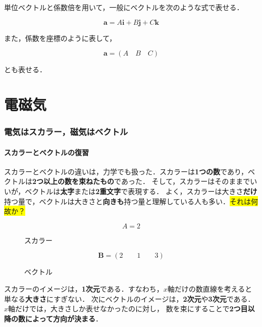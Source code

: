 \documentclass[a4paper,11pt]{ltjsarticle}
\begin{document}
単位ベクトルと係数倍を用いて，一般にベクトルを次のような式で表せる．

\begin{equation}
  \bm{a}=A \bm{i}+B \bm{j}+C \bm{k}
\end{equation}

また，係数を座標のように表して，

\begin{equation}
  \bm{a}=(A \quad B \quad C)
\end{equation}

とも表せる．

\clearpage

\part{電磁気}

\section{電気はスカラー，磁気はベクトル}

\subsection{スカラーとベクトルの復習}

スカラーとベクトルの違いは，力学でも扱った．スカラーは\textbf{1つの数}であり，ベクトルは\textbf{2つ以上の数を束ねたもの}であった．
そして，スカラーはそのままでいいが，ベクトルは\textbf{太字}または\textbf{2重文字}で表現する．
よく，スカラーは大きさ\textbf{だけ}持つ量で，ベクトルは大きさと\textbf{向きも}持つ量と理解している人も多い．\colorbox{yellow}{それは何故か？}

\begin{figure}[htbp]
\centering
\begin{minipage}[b]{0.49\columnwidth}
    \centering
    \begin{equation*}
      A = 2
    \end{equation*}
    \caption{スカラー}
\end{minipage}
\begin{minipage}[b]{0.49\columnwidth}
    \centering
    \begin{equation*}
      \bm{B} = (2 \qquad 1 \qquad 3)
    \end{equation*}
    \caption{ベクトル}
\end{minipage}
\end{figure}

スカラーのイメージは，\textbf{1次元}である．すなわち，$x$軸だけの数直線を考えると単なる\textbf{大きさ}にすぎない．
次にベクトルのイメージは，\textbf{2次元}や\textbf{3次元}である．$x$軸だけでは，大きさしか表せなかったのに対し，
数を束にすることで\textbf{2つ目以降の数によって方向が決まる}．
\end{document}
